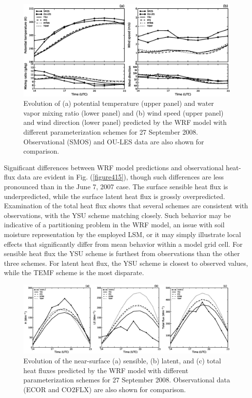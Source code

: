 \begin{figure}[ht!]
\begin{center}
\includegraphics[width=\textwidth]{figures/chapter4/meteogram_phys_20080927}
\end{center}
\caption{Evolution of (a) potential temperature (upper panel) and water vapor mixing ratio (lower panel) and (b) wind speed (upper panel) and wind direction (lower panel) predicted by the WRF model with different parameterization schemes for 27 September 2008. Observational (SMOS) and OU-LES data are also shown for comparison.}
\label{figure414}
\end{figure}


Significant differences between WRF model predictions and observational heat-flux data are evident in Fig. (\autoref{figure415}), though such differences are less pronounced than in the June 7, 2007 case. The surface sensible heat flux is underpredicted, while the surface latent heat flux is grossly overpredicted. Examination of the total heat flux shows that several schemes are consistent with observations, with the YSU scheme matching closely. Such behavior may be indicative of a partitioning problem in the WRF model, an issue with soil moisture representation by the employed LSM, or it may simply illustrate local effects that significantly differ from mean behavior within a model grid cell. For sensible heat flux the YSU scheme is furthest from observations than the other three schemes. For latent heat flux, the YSU scheme is closest to observed values, while the TEMF scheme is the most disparate. 


\begin{figure}[ht!]
\begin{center}
\includegraphics[width=\textwidth]{figures/chapter4/shf_lhf_phys_20080927}
\end{center}
\caption{Evolution of the near-surface (a) sensible, (b) latent, and (c) total heat fluxes predicted by the WRF model with different parameterization schemes for 27 September 2008. Observational data (ECOR and CO2FLX) are also shown for comparison.}
\label{figure415}
\end{figure}


